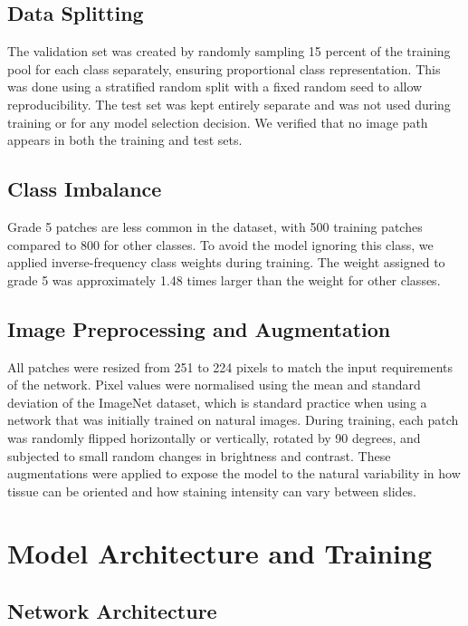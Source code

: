 \documentclass[12pt, a4paper]{article}
\begin{document}
\subsection{Data Splitting}

The validation set was created by randomly sampling 15 percent of the training pool
for each class separately, ensuring proportional class representation. This was done
using a stratified random split with a fixed random seed to allow reproducibility.
The test set was kept entirely separate and was not used during training or for any
model selection decision. We verified that no image path appears in both the training
and test sets.

\subsection{Class Imbalance}

Grade 5 patches are less common in the dataset, with 500 training patches compared
to 800 for other classes. To avoid the model ignoring this class, we applied
inverse-frequency class weights during training. The weight assigned to grade 5
was approximately 1.48 times larger than the weight for other classes.

\subsection{Image Preprocessing and Augmentation}

All patches were resized from 251 to 224 pixels to match the input requirements of
the network. Pixel values were normalised using the mean and standard deviation of
the ImageNet dataset, which is standard practice when using a network that was
initially trained on natural images. During training, each patch was randomly
flipped horizontally or vertically, rotated by 90 degrees, and subjected to small
random changes in brightness and contrast. These augmentations were applied to
expose the model to the natural variability in how tissue can be oriented and how
staining intensity can vary between slides.

\section{Model Architecture and Training}

\subsection{Network Architecture}
\end{document}

